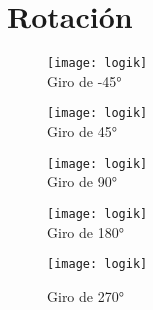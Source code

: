 \documentclass[11pt,a4paper]{article}
\begin{document}
\section{Rotación}

\begin{figure}[h!]
\begin{center}
\texttt{[image: logik]}\\
\caption{Giro de -45°}
\texttt{[image: logik]}\\
\caption{Giro de 45°}
\texttt{[image: logik]}\\
\caption{Giro de 90°}
\texttt{[image: logik]}\\
\caption{Giro de 180°}
\texttt{[image: logik]}\\
\caption{Giro de 270°}
\end{center}
\end{figure}
\end{document}
